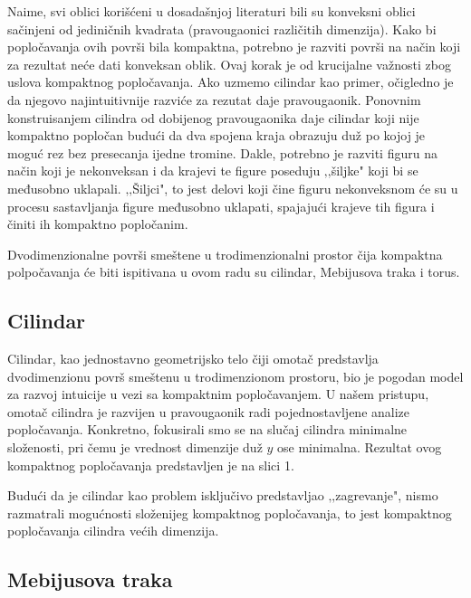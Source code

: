 Naime, svi oblici korišćeni u dosadašnjoj literaturi bili su konveksni oblici sačinjeni od jediničnih kvadrata (pravougaonici različitih dimenzija). Kako bi popločavanja ovih površi bila kompaktna, potrebno je razviti površi na način koji za rezultat neće dati konveksan oblik. Ovaj korak je od krucijalne važnosti zbog uslova kompaktnog popločavanja. Ako uzmemo cilindar kao primer, očigledno je da njegovo najintuitivnije razviće za rezutat daje pravougaonik. Ponovnim konstruisanjem cilindra od dobijenog pravougaonika daje cilindar koji nije kompaktno popločan budući da dva spojena kraja obrazuju duž po kojoj je moguć rez bez presecanja ijedne tromine. Dakle, potrebno je razviti figuru na način koji je nekonveksan i da krajevi te figure poseduju ‚‚šiljke" koji bi se međusobno uklapali. ‚‚Šiljci", to jest delovi koji čine figuru nekonveksnom će su u procesu sastavljanja figure međusobno uklapati, spajajući krajeve tih figura i činiti ih kompaktno popločanim.

Dvodimenzionalne površi smeštene u trodimenzionalni prostor čija kompaktna polpočavanja će biti ispitivana u ovom radu su cilindar, Mebijusova traka i torus.

\subsection{Cilindar}
Cilindar, kao jednostavno geometrijsko telo čiji omotač predstavlja dvodimenzionu površ smeštenu u trodimenzionom prostoru, bio je pogodan model za razvoj intuicije u vezi sa kompaktnim popločavanjem. U našem pristupu, omotač cilindra je razvijen u pravougaonik radi pojednostavljene analize popločavanja. Konkretno, fokusirali smo se na slučaj cilindra minimalne složenosti, pri čemu je vrednost dimenzije duž $y$ ose minimalna. Rezultat ovog kompaktnog popločavanja predstavljen je na slici 1.



Budući da je cilindar kao problem isključivo predstavljao ‚‚zagrevanje", nismo razmatrali mogućnosti složenijeg kompaktnog popločavanja, to jest kompaktnog popločavanja cilindra većih dimenzija.

\subsection{Mebijusova traka}

